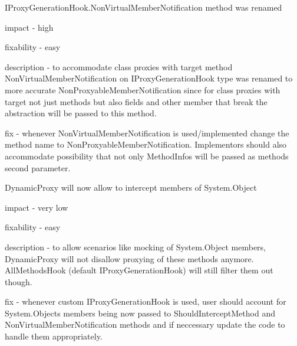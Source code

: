 \begin{DoxyItemize}
\begin{DoxyItemize}
\end{DoxyItemize}
\item I\+Proxy\+Generation\+Hook.\+Non\+Virtual\+Member\+Notification method was renamed
\begin{DoxyItemize}
\item impact -\/ high
\item fixability -\/ easy
\item description -\/ to accommodate class proxies with target method Non\+Virtual\+Member\+Notification on I\+Proxy\+Generation\+Hook type was renamed to more accurate Non\+Proxyable\+Member\+Notification since for class proxies with target not just methods but also fields and other member that break the abstraction will be passed to this method.
\item fix -\/ whenever Non\+Virtual\+Member\+Notification is used/implemented change the method name to Non\+Proxyable\+Member\+Notification. Implementors should also accommodate possibility that not only Method\+Infos will be passed as method\textquotesingle{}s second parameter.
\end{DoxyItemize}
\item Dynamic\+Proxy will now allow to intercept members of System.\+Object
\begin{DoxyItemize}
\item impact -\/ very low
\item fixability -\/ easy
\item description -\/ to allow scenarios like mocking of System.\+Object members, Dynamic\+Proxy will not disallow proxying of these methods anymore. All\+Methods\+Hook (default I\+Proxy\+Generation\+Hook) will still filter them out though.
\item fix -\/ whenever custom I\+Proxy\+Generation\+Hook is used, user should account for System.\+Object\textquotesingle{}s members being now passed to Should\+Intercept\+Method and Non\+Virtual\+Member\+Notification methods and if neccessary update the code to handle them appropriately.
\end{DoxyItemize}
\end{DoxyItemize}

